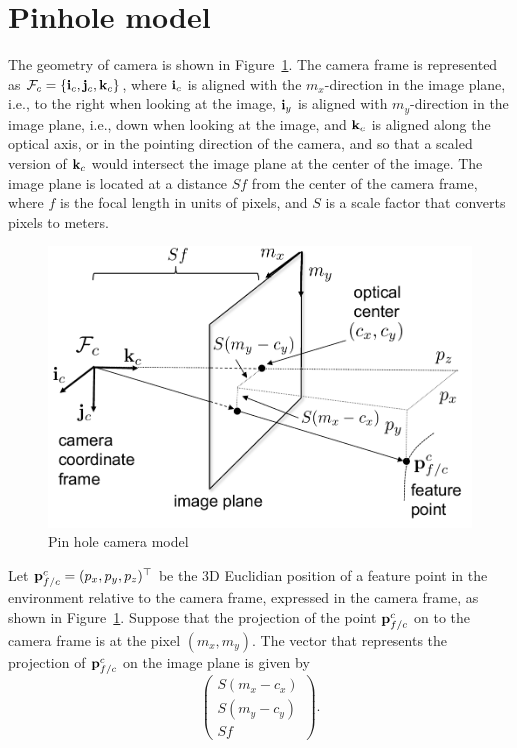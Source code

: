\section{Pinhole model}
\label{sec:pin_hole_model}

The geometry of camera is shown in Figure~\ref{fig:pin_hole_camera}.
The camera frame is represented as $\mathcal{F}_c = \{\mathbf{i}_c, \mathbf{j}_c, \mathbf{k}_c\}$, where $\mathbf{i}_c$ is aligned with the $m_x$-direction in the image plane, i.e., to the right when looking at the image, $\mathbf{i}_y$ is aligned with $m_y$-direction in the image plane, i.e., down when looking at the image, and $\mathbf{k}_c$ is aligned along the optical axis, or in the pointing direction of the camera, and so that a scaled version of $\mathbf{k}_c$ would intersect the image plane at the center of the image.  The image plane is located at a distance $Sf$ from the center of the camera frame, where $f$ is the focal length in units of pixels, and $S$ is a scale factor that converts pixels to meters.  
\begin{figure}[htb]
  \label{fig:pin_hole_camera}
  \centering
  \includegraphics[width=\linewidth]{chap6_camera_features/figures/pin_hole_camera}
  \caption{Pin hole camera model}
\end{figure}

Let $\mathbf{p}_{f/c}^c = (p_x, p_y, p_z)^\top$ be the 3D Euclidian position of a feature point in the environment relative to the camera frame, expressed in the camera frame, as shown in Figure~\ref{fig:pin_hole_camera}.  Suppose that the projection of the point $\mathbf{p}_{f/c}^c$ on to the camera frame is at  the pixel $(m_x, m_y)$.  The vector that represents the projection of $\mathbf{p}_{f/c}^c$ on the image plane is given by
\[
\begin{pmatrix} S(m_x-c_x) \\ S(m_y-c_y) \\ Sf \end{pmatrix}.
\]


